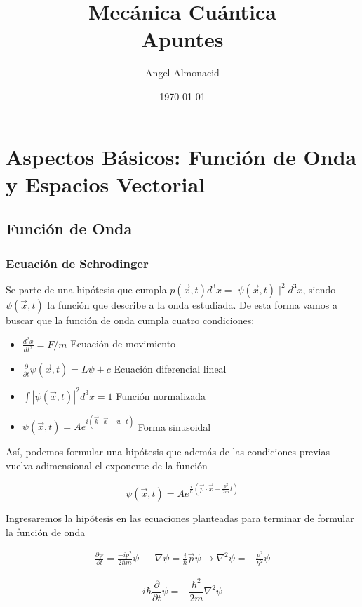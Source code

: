 \documentclass{report}
\title{\Huge{Mecánica Cuántica}\\Apuntes}
\author{\huge{Angel Almonacid}}
\date{\today}
\begin{document}
  \maketitle

\chapter{Aspectos Básicos: Función de Onda y Espacios Vectorial}
 \section{Función de Onda}
\subsection{Ecuación de Schrodinger}
Se parte de una hipótesis que cumpla $p(\vec{x},t)d^3x=\mid \psi(\vec{x},t)\mid^2d^3x$, siendo $\psi(\vec{x},t)$ la función que describe a la onda estudiada. De esta forma vamos a buscar que la función de onda cumpla cuatro condiciones:
\begin{itemize}
    \item $\frac{d^2x}{dt^2}=F/m$ Ecuación de movimiento \item $\frac{\partial}{\partial t} \psi(\vec{x},t)=L\psi+c$ Ecuación diferencial lineal \item $\int \left\lvert \psi(\vec{x},t) \right\rvert^2 d^3x=1 $ Función normalizada \item $\psi( \vec{x},t)=Ae^{i(\vec{k}\cdot \vec{x}-w\cdot t)}$ Forma sinusoidal
\end{itemize}

Así, podemos formular una hipótesis que además de las condiciones previas vuelva adimensional el exponente de la función

\begin{equation*}
    \psi(\vec{x},t)=Ae^{\frac{i}{\hbar}\left( \vec{p} \cdot \vec{x}- \frac{p^2}{2m}t\right)}
\end{equation*}

Ingresaremos la hipótesis en las ecuaciones planteadas para terminar de formular la función de onda

\begin{align*}
    \frac{\partial \psi}{\partial t}=\frac{-ip^2}{2\hbar m} \psi && \nabla\psi=\frac{i}{\hbar}\vec{p}\psi \rightarrow \nabla^2\psi=-\frac{p^2}{\hbar^2}\psi
\end{align*}

\begin{equation}\label{Schrodinger}
    i\hbar\frac{\partial}{\partial t} \psi=-\frac{\hbar^2}{2m}\nabla^2\psi
\end{equation}
\end{document}
